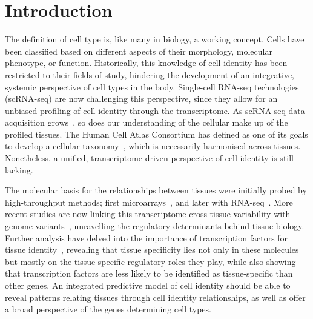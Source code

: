 \section{Introduction}
\label{section4.1}
The definition of cell type is, like many in biology, a working concept. Cells have been classified based on different aspects of their morphology, molecular phenotype, or function. Historically, this knowledge of cell identity has been restricted to their fields of study, hindering the development  of an integrative, systemic perspective of cell types in the body. Single-cell RNA-seq technologies (scRNA-seq) are now challenging this perspective, since they allow for an unbiased profiling of cell identity through the transcriptome. As scRNA-seq data acquisition grows~\citep{svensson_exponential_2018}, so does our understanding of the cellular make up of the profiled tissues. The Human Cell Atlas Consortium has defined as one of its goals to develop a cellular taxonomy~\citep{regev_human_2017}, which is necessarily harmonised across tissues. Nonetheless, a unified, transcriptome-driven perspective of cell identity is still lacking.

The molecular basis for the relationships between tissues were initially probed by high-throughput methods; first microarrays~\citep{enard_intra-_2002}, and later with RNA-seq~\citep{mortazavi_mapping_2008,brawand_evolution_2011,barbosa-morais_evolutionary_2012}. More recent studies are now linking this transcriptome cross-tissue  variability with genome variants~\citep{consortium_genotype-tissue_2015,gtex_consortium_genetic_2017}, unravelling the regulatory determinants behind tissue biology. Further analysis have delved into the importance of transcription factors for tissue identity~\citep{sonawane_understanding_2017}, revealing that tissue specificity lies not only in these molecules but mostly on the tissue-specific regulatory roles they play, while also showing that transcription factors are less likely to be identified as tissue-specific than other genes. An integrated predictive model of cell identity should be able to reveal patterns relating tissues through cell identity relationships, as well as offer a broad perspective of the genes determining cell types.

